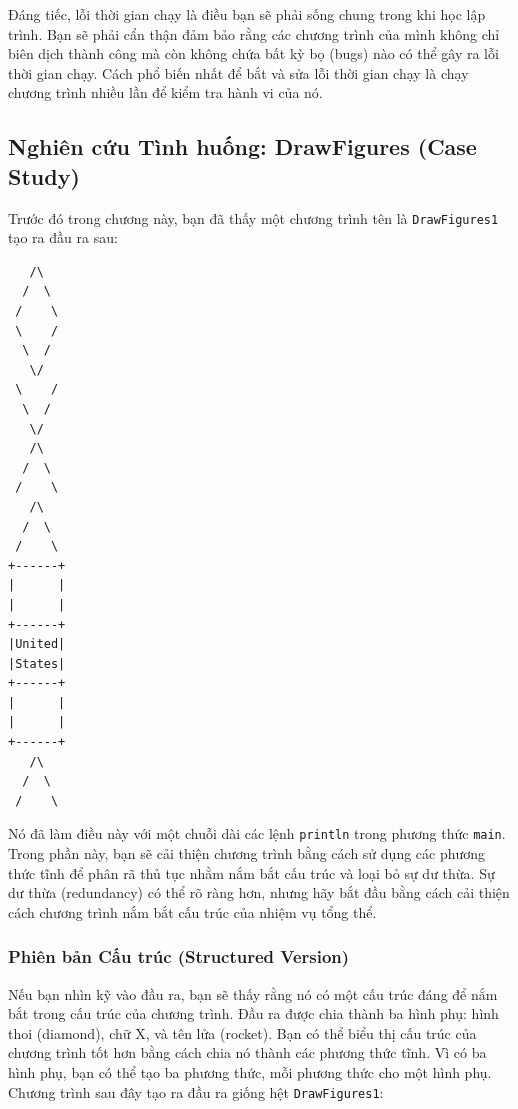 Đáng tiếc, lỗi thời gian chạy là điều bạn sẽ phải sống chung trong khi
học lập trình. Bạn sẽ phải cẩn thận đảm bảo rằng các chương trình của
mình không chỉ biên dịch thành công mà còn không chứa bất kỳ bọ (bugs)
nào có thể gây ra lỗi thời gian chạy. Cách phổ biến nhất để bắt và sửa
lỗi thời gian chạy là chạy chương trình nhiều lần để kiểm tra hành vi
của nó.

\subsection{Nghiên cứu Tình huống: DrawFigures (Case
Study)}\label{nghiuxean-cux1ee9u-tuxecnh-huux1ed1ng-drawfigures-case-study}

Trước đó trong chương này, bạn đã thấy một chương trình tên là
\texttt{DrawFigures1} tạo ra đầu ra sau:

\begin{verbatim}
   /\ 
  /  \ 
 /    \ 
 \    / 
  \  / 
   \/ 
 \    / 
  \  / 
   \/ 
   /\ 
  /  \ 
 /    \ 
   /\ 
  /  \ 
 /    \ 
+------+ 
|      | 
|      | 
+------+ 
|United| 
|States| 
+------+ 
|      | 
|      | 
+------+ 
   /\ 
  /  \ 
 /    \
\end{verbatim}

Nó đã làm điều này với một chuỗi dài các lệnh \texttt{println} trong
phương thức \texttt{main}. Trong phần này, bạn sẽ cải thiện chương trình
bằng cách sử dụng các phương thức tĩnh để phân rã thủ tục nhằm nắm bắt
cấu trúc và loại bỏ sự dư thừa. Sự dư thừa (redundancy) có thể rõ ràng
hơn, nhưng hãy bắt đầu bằng cách cải thiện cách chương trình nắm bắt cấu
trúc của nhiệm vụ tổng thể.

\subsubsection{Phiên bản Cấu trúc (Structured
Version)}\label{phiuxean-bux1ea3n-cux1ea5u-truxfac-structured-version}

Nếu bạn nhìn kỹ vào đầu ra, bạn sẽ thấy rằng nó có một cấu trúc đáng để
nắm bắt trong cấu trúc của chương trình. Đầu ra được chia thành ba hình
phụ: hình thoi (diamond), chữ X, và tên lửa (rocket). Bạn có thể biểu
thị cấu trúc của chương trình tốt hơn bằng cách chia nó thành các phương
thức tĩnh. Vì có ba hình phụ, bạn có thể tạo ba phương thức, mỗi phương
thức cho một hình phụ. Chương trình sau đây tạo ra đầu ra giống hệt
\texttt{DrawFigures1}:

